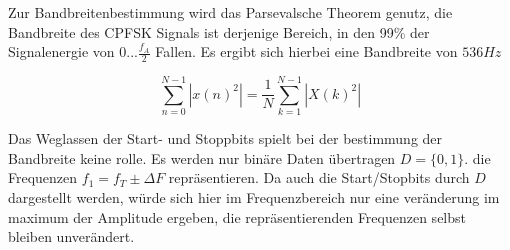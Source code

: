 \documentclass{article}
\begin{document}
Zur Bandbreitenbestimmung wird das Parsevalsche Theorem genutz, die Bandbreite des CPFSK Signals ist derjenige Bereich,
in den 99\% der Signalenergie von $0...\frac{f_A}{2}$ Fallen. Es ergibt sich hierbei eine Bandbreite von $536Hz$

$$
\sum_{n = 0}^{N - 1}\left\lvert x(n)^2\right\rvert =  \frac{1}{N} \sum_{k = 1}^{N-1}  \left\lvert X(k)^2\right\rvert 
$$

%
%
%
%
%

Das Weglassen der Start- und Stoppbits spielt bei der bestimmung der Bandbreite keine rolle.
Es werden nur binäre Daten übertragen $D = \{0, 1\}$. die Frequenzen $ f_1 = f_T \pm \varDelta F $ repräsentieren. 
Da auch die Start/Stopbits durch $D$ dargestellt werden, würde sich hier im Frequenzbereich
nur eine veränderung im maximum der Amplitude ergeben, die repräsentierenden Frequenzen selbst bleiben unverändert.







\end{document}
